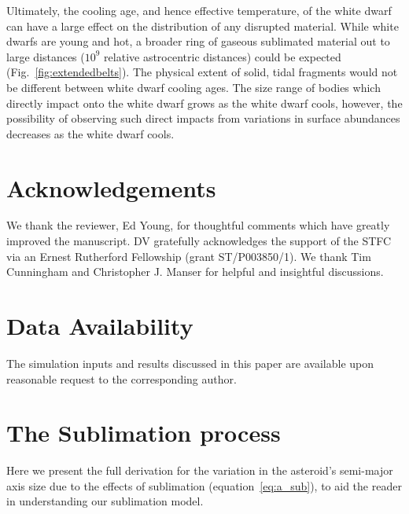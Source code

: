 \documentclass[fleqn,usenatbib]{mnras}
\begin{document}
Ultimately, the cooling age, and hence effective temperature, of the white dwarf can have a large effect on the distribution of any disrupted material. 
While white dwarfs are young and hot, a broader ring of gaseous sublimated material out to large distances ($10^9$ relative astrocentric distances) could be expected (Fig.~\ref{fig:extendedbelts}).
The physical extent of solid, tidal fragments would not be different between white dwarf cooling ages. 
The size range of bodies which directly impact onto the white dwarf grows as the white dwarf cools, however, the possibility of observing such direct impacts from variations in surface abundances decreases as the white dwarf cools. 

\section*{Acknowledgements}
We thank the reviewer, Ed Young, for thoughtful comments which have greatly improved the manuscript.
DV gratefully acknowledges the support of the STFC via an Ernest Rutherford Fellowship (grant ST/P003850/1). We thank Tim Cunningham and Christopher J. Manser for helpful and insightful discussions.

\section*{Data Availability}
The simulation inputs and results discussed in this paper are available upon reasonable request to the corresponding author. 








\appendix

\section{The Sublimation process} \label{app:sub}
Here we present the full derivation for the variation in the asteroid's semi-major axis size due to the effects of sublimation (equation~\ref{eq:a_sub}), to aid the reader in understanding our sublimation model.
\end{document}
